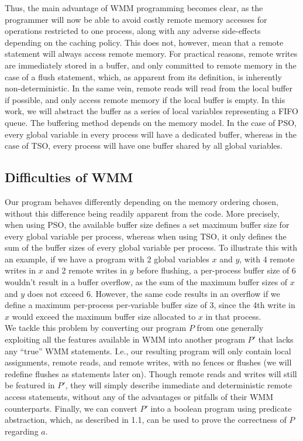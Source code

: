 Thus, the main advantage of WMM programming becomes clear, as the programmer will now be able to avoid costly remote memory accesses for operations restricted to one process, along with any adverse side-effects depending on the caching policy. This does not, however, mean that a remote statement will always access remote memory. For practical reasons, remote writes are immediately stored in a buffer, and only committed to remote memory in the case of a flush statement, which, as apparent from its definition, is inherently non-deterministic. In the same vein, remote reads will read from the local buffer if possible, and only access remote memory if the local buffer is empty. In this work, we will abstract the buffer as a series of local variables representing a FIFO queue. The buffering method depends on the memory model. In the case of PSO, every global variable in every process will have a dedicated buffer, whereas in the case of TSO, every process will have one buffer shared by all global variables.

\subsection{Difficulties of WMM}

Our program behaves differently depending on the memory ordering chosen, without this difference being readily apparent from the code. More precisely, when using PSO, the available buffer size defines a set maximum buffer size for every global variable per process, whereas when using TSO, it only defines the sum of the buffer sizes of every global variable per process. To illustrate this with an example, if we have a program with 2 global variables $x$ and $y$, with 4 remote writes in $x$ and 2 remote writes in $y$ before flushing, a per-process buffer size of 6 wouldn't result in a buffer overflow, as the sum of the maximum buffer sizes of $x$ and $y$ does not exceed 6. However, the same code results in an overflow if we define a maximum per-process per-variable buffer size of 3, since the 4th write in $x$ would exceed the maximum buffer size allocated to $x$ in that process.\\

We tackle this problem by converting our program $P$ from one generally exploiting all the features available in WMM into another program $P'$ that lacks any ``true'' WMM statements. I.e., our resulting program will only contain local assignments, remote reads, and remote writes, with no fences or flushes (we will redefine flushes as statements later on). Though remote reads and writes will still be featured in $P'$, they will simply describe immediate and deterministic remote access statements, without any of the advantages or pitfalls of their WMM counterparts. Finally, we can convert $P'$ into a boolean program using predicate abstraction, which, as described in 1.1, can be used to prove the correctness of $P$ regarding $a$.\\

